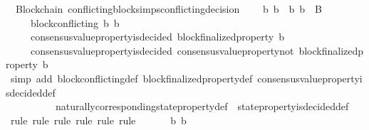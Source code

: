 \begin{isabellebody}
\isanewline
{}\isamarkupfalse%
\ {\isacharparenleft}\ Blockchain{\isacharparenright}\ conflicting{\isacharunderscore}blocks{\isacharunderscore}imps{\isacharunderscore}conflicting{\isacharunderscore}decision\ {\isacharcolon}\isanewline
\ \ {\isachardoublequoteopen}{\isasymforall}\ b{}\ b{}\ {\isasymsigma}{\isachardot}\ {\isacharbraceleft}b{}{\isacharcomma}\ b{}{\isacharbraceright}\ {\isasymsubseteq}\ B\ {\isasymand}\ {\isasymsigma}\ {\isasymin}\ {\isasymSigma}\ \isanewline
\ \ \ \ {\isasymlongrightarrow}\ block{\isacharunderscore}conflicting\ {\isacharparenleft}b{}{\isacharcomma}\ b{}{\isacharparenright}\ \isanewline
\ \ \ \ {\isasymlongrightarrow}\ consensus{\isacharunderscore}value{\isacharunderscore}property{\isacharunderscore}is{\isacharunderscore}decided\ {\isacharparenleft}block{\isacharunderscore}finalized{\isacharunderscore}property\ b{}{\isacharcomma}\ {\isasymsigma}{\isacharparenright}\ \isanewline
\ \ \ \ {\isasymlongrightarrow}\ consensus{\isacharunderscore}value{\isacharunderscore}property{\isacharunderscore}is{\isacharunderscore}decided\ {\isacharparenleft}consensus{\isacharunderscore}value{\isacharunderscore}property{\isacharunderscore}not\ {\isacharparenleft}block{\isacharunderscore}finalized{\isacharunderscore}property\ b{}{\isacharparenright}{\isacharcomma}\ {\isasymsigma}{\isacharparenright}{\isachardoublequoteclose}\isanewline
%
\isadelimproof
\ \ %
\endisadelimproof
%
\isatagproof
{}\isamarkupfalse%
\ {\isacharparenleft}simp\ add{\isacharcolon}\ block{\isacharunderscore}conflicting{\isacharunderscore}def\ block{\isacharunderscore}finalized{\isacharunderscore}property{\isacharunderscore}def\ consensus{\isacharunderscore}value{\isacharunderscore}property{\isacharunderscore}is{\isacharunderscore}decided{\isacharunderscore}def\isanewline
\ \ \ \ \ \ \ \ \ \ naturally{\isacharunderscore}corresponding{\isacharunderscore}state{\isacharunderscore}property{\isacharunderscore}def\ \ state{\isacharunderscore}property{\isacharunderscore}is{\isacharunderscore}decided{\isacharunderscore}def{\isacharparenright}\isanewline
\ \ \isamarkupfalse%
\ {\isacharparenleft}rule{\isacharcomma}\ rule{\isacharcomma}\ rule{\isacharcomma}\ rule{\isacharcomma}\ rule{\isacharcomma}\ rule{\isacharparenright}\ \isanewline
{}\isamarkupfalse%
\ {\isacharminus}\isanewline
\ \ \isamarkupfalse%
\ b{}\ b{}\ {\isasymsigma}\isanewline
\ \ \isamarkupfalse%

\end{isabellebody}
